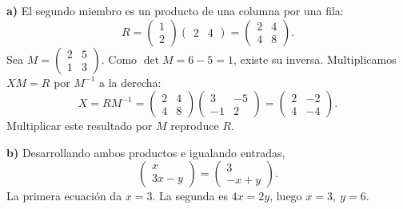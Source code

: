 \textbf{a)} El segundo miembro es un producto de una columna por una fila:
\[
 R=\begin{pmatrix}1\\2\end{pmatrix}\begin{pmatrix}2&4\end{pmatrix}
  =\begin{pmatrix}2&4\\4&8\end{pmatrix}.
\]
Sea $M=\begin{pmatrix}2&5\\1&3\end{pmatrix}$. Como $\det M=6-5=1$, existe su inversa. Multiplicamos $XM=R$ por $M^{-1}$ a la derecha:
\[
 X=RM^{-1}
 =\begin{pmatrix}2&4\\4&8\end{pmatrix}
  \begin{pmatrix}3&-5\\-1&2\end{pmatrix}
 =\boxed{\begin{pmatrix}2&-2\\4&-4\end{pmatrix}}.
\]
Multiplicar este resultado por $M$ reproduce $R$.

\textbf{b)} Desarrollando ambos productos e igualando entradas,
\[
 \begin{pmatrix}x\\3x-y\end{pmatrix}
 =\begin{pmatrix}3\\-x+y\end{pmatrix}.
\]
La primera ecuación da $x=3$. La segunda es $4x=2y$, luego $\boxed{x=3,\ y=6}$.
